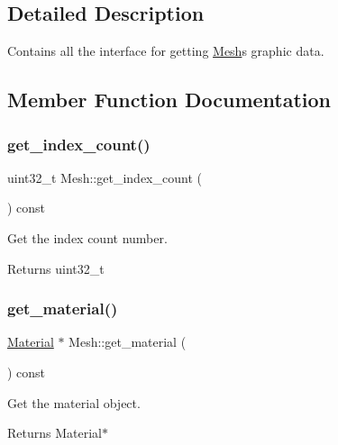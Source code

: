 \subsection{Detailed Description}
Contains all the interface for getting \hyperlink{classMesh}{Mesh}\textquotesingle{}s graphic data. 

\subsection{Member Function Documentation}
\mbox{\label{classMesh_a2728b2c9d70d9b7cb5df407bad0b1057}} 
\subsubsection{\texorpdfstring{get\+\_\+index\+\_\+count()}{get\_index\_count()}}
{\footnotesize\ttfamily uint32\+\_\+t Mesh\+::get\+\_\+index\+\_\+count (\begin{DoxyParamCaption}{ }\end{DoxyParamCaption}) const}



Get the index count number. 

\begin{DoxyReturn}{Returns}
uint32\+\_\+t 
\end{DoxyReturn}
\mbox{\label{classMesh_aef61adb0e64d3124731090da8f43977f}} 
\subsubsection{\texorpdfstring{get\+\_\+material()}{get\_material()}}
{\footnotesize\ttfamily \hyperlink{classMaterial}{Material} $\ast$ Mesh\+::get\+\_\+material (\begin{DoxyParamCaption}{ }\end{DoxyParamCaption}) const}



Get the material object. 

\begin{DoxyReturn}{Returns}
Material$\ast$ 
\end{DoxyReturn}
\mbox{\label{classMesh_ac6ff36aa0676d9cae667631056e868b3}} 
